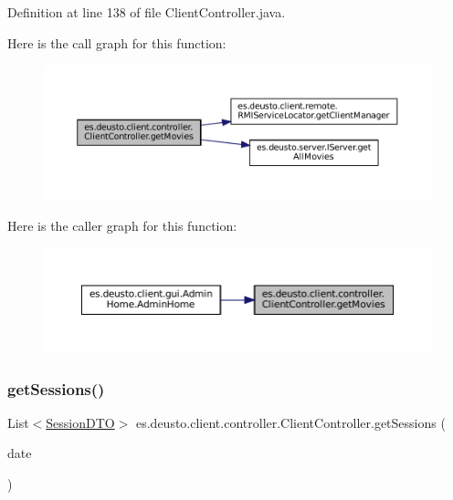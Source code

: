 Definition at line 138 of file Client\+Controller.\+java.

Here is the call graph for this function\+:
\nopagebreak
\begin{figure}[H]
\begin{center}
\leavevmode
\includegraphics[width=350pt]{classes_1_1deusto_1_1client_1_1controller_1_1_client_controller_ad69e183cc953af14b9d526c635eecb61_cgraph}
\end{center}
\end{figure}
Here is the caller graph for this function\+:
\nopagebreak
\begin{figure}[H]
\begin{center}
\leavevmode
\includegraphics[width=350pt]{classes_1_1deusto_1_1client_1_1controller_1_1_client_controller_ad69e183cc953af14b9d526c635eecb61_icgraph}
\end{center}
\end{figure}
\mbox{\label{classes_1_1deusto_1_1client_1_1controller_1_1_client_controller_a06a84e0834fb21c31f4988e26ee6dedf}} 
\subsubsection{\texorpdfstring{getSessions()}{getSessions()}}
{\footnotesize\ttfamily List$<$\mbox{\hyperlink{classes_1_1deusto_1_1server_1_1data_1_1_session_d_t_o}{Session\+D\+TO}}$>$ es.\+deusto.\+client.\+controller.\+Client\+Controller.\+get\+Sessions (\begin{DoxyParamCaption}\item[{Local\+Date}]{date }\end{DoxyParamCaption})}



